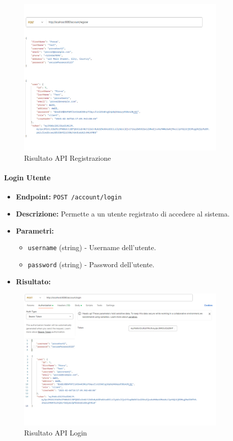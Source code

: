 \begin{figure}[H]
    \centering
    \includegraphics[width=0.9\textwidth]{images/registerapi.png}
    \caption{Risultato API Registrazione}
    \label{fig:api_register}
\end{figure}

\paragraph{Login Utente}
\begin{itemize}
    \item \textbf{Endpoint:} \texttt{POST /account/login}
    \item \textbf{Descrizione:} Permette a un utente registrato di accedere al sistema.
    \item \textbf{Parametri:}
    \begin{itemize}
        \item \texttt{username} (string) - Username dell'utente.
        \item \texttt{password} (string) - Password dell'utente.
    \end{itemize}
    \item \textbf{Risultato:}  
\end{itemize}
\begin{figure}[H]
    \centering
    \includegraphics[width=0.9\textwidth]{images/loginapi.png}
    \caption{Risultato API Login}
    \label{fig:api_login}
\end{figure}

